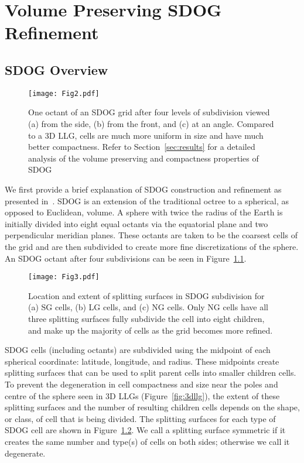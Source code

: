 \chapter{Volume Preserving SDOG Refinement} \label{chap:sdog}


\section{SDOG Overview}

\begin{figure}[tbp]
	\texttt{[image: Fig2.pdf]}
	\caption{One octant of an SDOG grid after four levels of subdivision viewed (a) from the side, (b) from the front, and (c) at an angle.
		Compared to a 3D LLG, cells are much more uniform in size and have much better compactness.
		Refer to Section~\ref{sec:results} for a detailed analysis of the volume preserving and compactness properties of SDOG}
	\label{fig:sdog}
\end{figure}


We first provide a brief explanation of SDOG construction and refinement as presented in~\cite{yu2009sdog}.
SDOG is an extension of the traditional octree to a spherical, as opposed to Euclidean, volume.
A sphere with twice the radius of the Earth is initially divided into eight equal octants via the equatorial plane and two perpendicular meridian planes.
These octants are taken to be the coarsest cells of the grid and are then subdivided to create more fine discretizations of the sphere.
An SDOG octant after four subdivisions can be seen in Figure~\ref{fig:sdog}.


\begin{figure}[tbp]
	\texttt{[image: Fig3.pdf]}
	\caption{Location and extent of splitting surfaces in SDOG subdivision for (a) SG cells, (b) LG cells, and (c) NG cells.
		Only NG cells have all three splitting surfaces fully subdivide the cell into eight children, and make up the majority of cells as the grid becomes more refined.}
	\label{fig:subRules}
\end{figure}


SDOG cells (including octants) are subdivided using the midpoint of each spherical coordinate: latitude, longitude, and radius.
These midpoints create splitting surfaces that can be used to split parent cells into smaller children cells.
To prevent the degeneration in cell compactness and size near the poles and centre of the sphere seen in 3D LLGs (Figure~\ref{fig:3dllg}), the extent of these splitting surfaces and the number of resulting children cells depends on the shape, or class, of cell that is being divided.
The splitting surfaces for each type of SDOG cell are shown in Figure~\ref{fig:subRules}.
We call a splitting surface symmetric if it creates the same number and type(s) of cells on both sides; otherwise we call it degenerate.


